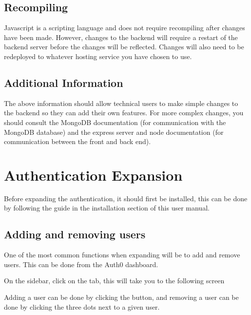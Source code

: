 \documentclass[letterpaper,10pt,english]{sphinxmanual}
\let\sphinxpxdimen\pdfpxdimen\else\newdimen\sphinxpxdimen
\begin{document}
\subsection{Recompiling}
\label{\detokenize{docs/Expansion/api-expansion:recompiling}}
Javascript is a scripting language and does not require recompiling
after changes have been made. However, changes to the back\sphinxhyphen{}end will
require a restart of the back\sphinxhyphen{}end server before the changes will be
reflected. Changes will also need to be redeployed to whatever hosting
service you have chosen to use.


\subsection{Additional Information}
\label{\detokenize{docs/Expansion/api-expansion:additional-information}}
The above information should allow technical users to make simple
changes to the back\sphinxhyphen{}end so they can add their own features. For more
complex changes, you should consult the MongoDB documentation (for
communication with the MongoDB database) and the express server and node
documentation (for communication between the front and back end).


\section{Authentication Expansion}
\label{\detokenize{docs/Expansion/auth-expansion:authentication-expansion}}\label{\detokenize{docs/Expansion/auth-expansion::doc}}
Before expanding the authentication, it should first be installed, this
can be done by following the guide in the installation section of this
user manual.


\subsection{Adding and removing users}
\label{\detokenize{docs/Expansion/auth-expansion:adding-and-removing-users}}
One of the most common functions when expanding will be to add and
remove users. This can be done from the Auth0 dashboard.

On the sidebar, click on the  tab, this will take you
to the following screen

\noindent\sphinxincludegraphics[width=300\sphinxpxdimen]{{add_users}.png}

Adding a user can be done by clicking the  button, and
removing a user can be done by clicking the three dots next to a given
user.
\end{document}
